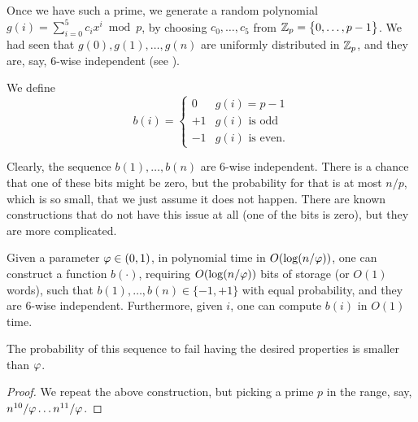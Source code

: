 Once we have such a prime, we generate a random polynomial
$g(i) = \sum_{i=0}^5 c_i x^i \bmod p$, by choosing $c_0, \ldots, c_5$
from $\mathbb{Z}_p = \left\{ {0, \ldots, p-1 \bigl. } \right\}$.  We had seen that
$g(0), g(1), \ldots, g(n)$ are uniformly distributed in $\mathbb{Z}_p$, and
they are, say, $6$-wise independent (see ).


We define
\begin{equation*}
    b(i)%
    =%
    \begin{cases}
        0 & g(i) = p-1 \\
        +1 & g(i) \text{ is odd}\\
        -1 & g(i) \text{ is even}.
    \end{cases}
\end{equation*}

Clearly, the sequence $b(1), \ldots, b(n)$ are $6$-wise
independent. There is a chance that one of these bits might be zero,
but the probability for that is at most $n/p$, which is so small, that
we just assume it does not happen. There are known constructions that
do not have this issue at all (one of the bits is zero), but they are
more complicated.

\begin{lemma}
    Given a parameter $\varphi \in (0,1)$, in polynomial time in
    $O(\log (n/\varphi))$, one can construct a function $b(\cdot)$,
    requiring $O( \log (n/\varphi))$ bits of storage (or $O(1)$
    words), such that $b(1), \ldots, b(n) \in \{-1,+1\}$ with equal
    probability, and they are $6$-wise independent. Furthermore, given
    $i$, one can compute $b(i)$ in $O(1)$ time.

    The probability of this sequence to fail having the desired
    properties is smaller than $\varphi$.
\end{lemma}
\begin{proof}
    We repeat the above construction, but picking a prime $p$ in the
    range, say, $n^{10}/ \varphi \ldots n^{11} /\varphi$.
\end{proof}



